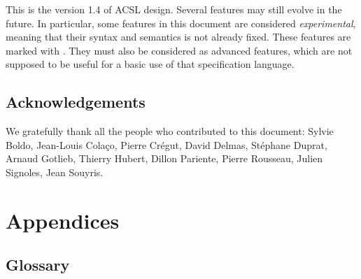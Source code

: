 \documentclass[a4paper,11pt,twoside,openright,web]{frama-c-book}
\newcommand{\version}{1.4}
\begin{document}
This is the version \version{} of ACSL design. Several features may still
evolve in the future. In particular, some features in this document
are considered \emph{experimental}, meaning that their syntax and
semantics is not already fixed.  These features are marked with
\experimental.  They must also be considered as advanced features,
which are not supposed to be useful for a basic use of that
specification language.

\section*{Acknowledgements}

We gratefully thank all the people who contributed to this document:
Sylvie Boldo,
Jean-Louis Cola\c{c}o,
Pierre Cr\'egut,
David Delmas,
St\'ephane Duprat,
Arnaud Gotlieb,
Thierry Hubert,
Dillon Pariente,
Pierre Rousseau,
Julien Signoles,
Jean Souyris.









\appendix

\chapter{Appendices}
\label{chap:appendix}



\section{Glossary}
\label{sec:glossary}
\end{document}
